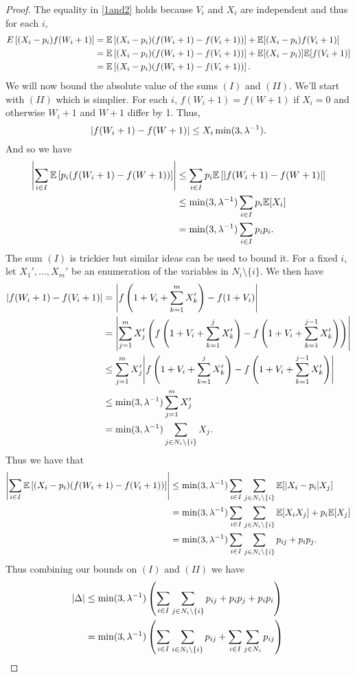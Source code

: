 \begin{proof}
   The equality in \eqref{1and2} holds because $V_i$ and $X_i$ are independent and thus for each $i$,
    \begin{align*}
        E\left[(X_i-p_i)f(W_i+1)\right] &= {\mathbb{E}}\left[(X_i-p_i)(f(W_i+1)-f(V_i+1))\right]+{\mathbb{E}}[(X_i-p_i)f(V_i+1)]\\
        &={\mathbb{E}}\left[(X_i-p_i)(f(W_i+1)-f(V_i+1))\right]+{\mathbb{E}}[(X_i-p_i)]{\mathbb{E}}[f(V_i+1)]\\
        &={\mathbb{E}}\left[(X_i-p_i)(f(W_i+1)-f(V_i+1))\right].
    \end{align*}
    We will now bound the absolute value of the sums $(I)$ and $(II)$. We'll start with $(II)$ which is simplier. For each $i$, $f(W_i+1)=f(W+1)$ if $X_i=0$ and otherwise $W_i+1$ and $W+1$ differ by 1. Thus,
    \[{\left\lvert f(W_i+1)-f(W+1)\right\rvert} \le X_i \min(3,\lambda^{-1}). \]
    And so we have
    \begin{align*}
        {\left\lvert\sum_{i \in I}{\mathbb{E}}\left[p_i(f(W_i+1)-f(W+1))\right]\right\rvert}&\le \sum_{i\in I} p_i{\mathbb{E}}\left[{\left\lvert f(W_i+1)-f(W+1)\right\rvert}\right]\\
        &\le \min(3,\lambda^{-1})\sum_{i \in I}p_i {\mathbb{E}}[X_i]\\
        &=\min(3,\lambda^{-1})\sum_{i \in I}p_ip_i.
    \end{align*}
    The sum $(I)$ is trickier but similar ideas can be used to bound it. For a fixed $i$, let $X_1',\ldots, X_m'$ be an enumeration of the variables in $N_i \setminus \{i\}$. We then have
     \begin{align*}
         {\left\lvert f(W_i+1)-f(V_i+1)\right\rvert}&={\left\lvert f\left(1+V_i+\sum_{k=1}^m X_k'\right)-f(1+V_i)\right\rvert}\\
         &={\left\lvert\sum_{j=1}^m X_j'\left(f\left(1+V_i+\sum_{k=1}^j X_k'\right)-f\left(1+V_i+\sum_{k=1}^{j-1} X_k'\right)\right)\right\rvert}\\
         &\le \sum_{j=1}^m X_j'{\left\lvert f\left(1+V_i+\sum_{k=1}^j X_k'\right)-f\left(1+V_i+\sum_{k=1}^{j-1} X_k'\right)\right\rvert}\\
         &\le \min(3,\lambda^{-1})\sum_{j=1}^m X_j'\\
         &=\min(3,\lambda^{-1})\sum_{j \in N_i \setminus \{i\}} X_j.
     \end{align*}
     Thus we have that 
     \begin{align*}
         {\left\lvert\sum_{i \in I}{\mathbb{E}}\left[(X_i-p_i)(f(W_i+1)-f(V_i+1))\right]\right\rvert}&\le \min(3,\lambda^{-1})\sum_{i\in I}\sum_{j \in N_i \setminus \{i\}} {\mathbb{E}}[{\left\lvert X_i-p_i\right\rvert}X_j]\\
         &=\min(3,\lambda^{-1})\sum_{i\in I}\sum_{j \in N_i \setminus \{i\}} {\mathbb{E}}[X_iX_j]+p_i{\mathbb{E}}[X_j]\\
         &=\min(3,\lambda^{-1})\sum_{i\in I}\sum_{j \in N_i \setminus \{i\}} p_{ij}+p_ip_j.\\
     \end{align*}
     Thus combining our bounds on $(I)$ and $(II)$ we have 
     \begin{align*}
         {\left\lvert\Delta\right\rvert} &\le \min(3,\lambda^{-1})\left(\sum_{i\in I}\sum_{j \in N_i \setminus \{i\}} p_{ij}+p_ip_j + p_{i}p_i\right)\\
         &= \min(3,\lambda^{-1})\left(\sum_{i \in I}\sum_{i \in N_i \setminus \{i\}}p_{ij}+\sum_{i \in I}\sum_{j \in N_i}p_{ij}\right)\qedhere 
     \end{align*}
\end{proof}
\newpage

